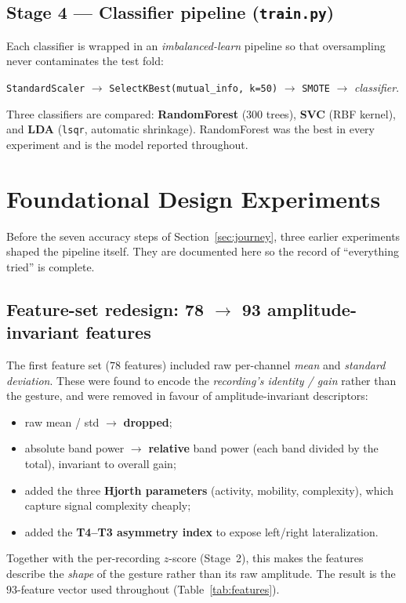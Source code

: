 \documentclass[11pt,a4paper]{article}
\newcommand{\code}[1]{\texttt{#1}}
\begin{document}
\subsection{Stage 4 --- Classifier pipeline (\code{train.py})}
Each classifier is wrapped in an \emph{imbalanced-learn} pipeline so that
oversampling never contaminates the test fold:
\begin{center}
\code{StandardScaler} $\rightarrow$ \code{SelectKBest(mutual\_info, k=50)}
$\rightarrow$ \code{SMOTE} $\rightarrow$ \emph{classifier}.
\end{center}
Three classifiers are compared:
\textbf{RandomForest} ($300$ trees), \textbf{SVC} (RBF kernel), and
\textbf{LDA} (\code{lsqr}, automatic shrinkage). RandomForest was the best in
every experiment and is the model reported throughout.

\section{Foundational Design Experiments}
\label{sec:foundational}
Before the seven accuracy steps of Section~\ref{sec:journey}, three earlier
experiments shaped the pipeline itself. They are documented here so the record of
``everything tried'' is complete.

\subsection{Feature-set redesign: 78 $\to$ 93 amplitude-invariant features}
The first feature set ($78$ features) included raw per-channel \emph{mean} and
\emph{standard deviation}. These were found to encode the \emph{recording's
identity / gain} rather than the gesture, and were removed in favour of
amplitude-invariant descriptors:
\begin{itemize}[noitemsep]
  \item raw mean / std $\to$ \textbf{dropped};
  \item absolute band power $\to$ \textbf{relative} band power (each band divided
  by the total), invariant to overall gain;
  \item added the three \textbf{Hjorth parameters} (activity, mobility,
  complexity), which capture signal complexity cheaply;
  \item added the \textbf{T4--T3 asymmetry index} to expose left/right
  lateralization.
\end{itemize}
Together with the per-recording $z$-score (Stage~2), this makes the features
describe the \emph{shape} of the gesture rather than its raw amplitude. The
result is the $93$-feature vector used throughout (Table~\ref{tab:features}).
\end{document}

